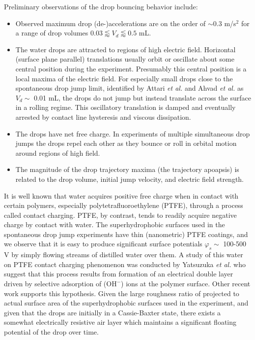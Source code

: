 \documentclass[aip,reprint, floatfix]{revtex4-1}
\begin{document}
Preliminary observations of the drop bouncing behavior include:
\begin{itemize}
\item Observed maximum drop (de-)accelerations are on the order of $\sim$0.3 m/s$^2$ for a range of drop volumes $0.03 \lessapprox V_d \lessapprox 0.5$ mL.
\item The water drops are attracted to regions of high electric field. Horizontal (surface plane parallel) translations usually orbit or oscillate about some central position during the experiment. Presumably this central position is a local maxima of the electric field. For especially small drops close to the spontaneous drop jump limit, identified by Attari \emph{et al.} \citep{attari_puddle_2016} and Ahvad \emph{et al.} \citep{avhad_numerical_2020} as $V_d \sim$ 0.01 mL, the drops do not jump but instead translate across the surface in a rolling regime. This oscillatory translation is damped and eventually arrested by contact line hysteresis and viscous dissipation.
\item The drops have net free charge. In experiments of multiple simultaneous drop jumps the drops repel each other as they bounce or roll in orbital motion around regions of high field.
\item The magnitude of the drop trajectory maxima (the trajectory apoapsis) is related to the drop volume, initial jump velocity, and electric field strength.
\end{itemize}

It is well known that water acquires positive free charge when in contact with certain polymers, especially polytetrafluoroethylene (PTFE), through a process called contact charging. \cite{langmuir_surface_1938} PTFE, by contrast, tends to readily acquire negative charge by contact with water. The superhydrophobic surfaces used in the spontaneous drop jump experiments have thin (nanometric) PTFE coatings, and we observe that it is easy to produce significant surface potentials $\varphi_s \sim$ 100-500 V by simply flowing streams of distilled water over them. A study of this water on PTFE contact charging phenomenon was conducted by Yatsuzuka \emph{et al.} \cite{yatsuzuka_electrification_1994} who suggest that this process results from formation of an electrical double layer driven by selective adsorption of ($\mbox{OH}^-$) ions at the polymer surface. Other recent work supports this hypothesis. \cite{beattie_intrinsic_2006, strazdaite_water_2015} Given the large roughness ratio of projected to actual surface area of the superhydrophobic surfaces used in the experiment, and given that the drops are initially in a Cassie-Baxter state, there exists a somewhat electrically resistive air layer which maintains a significant floating potential of the drop over time.
\end{document}

